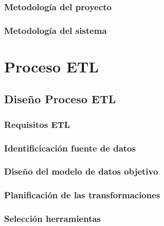 \documentclass[letterpaper, 12pt]{report}
\begin{document}
\subsection{Metodología del proyecto}


\subsection{Metodología del sistema}


\chapter{Proceso ETL}

\section{Diseño Proceso ETL}


\subsection{Requisitos ETL}


\subsection{Identificicación fuente de datos}


\subsection{Diseño del modelo de datos objetivo}


\subsection{Planificación de las transformaciones}


\subsection{Selección herramientas}

\end{document}

